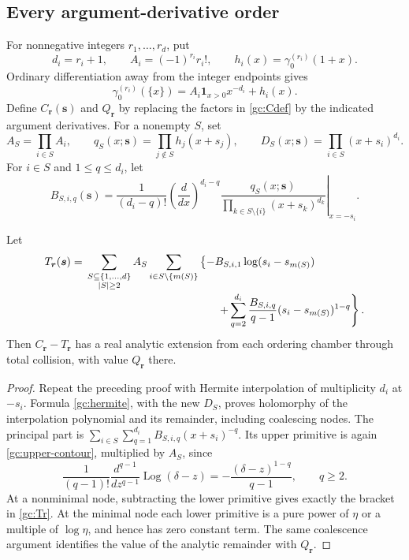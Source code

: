 \subsection{Every argument-derivative order}
For nonnegative integers $r_1,\ldots,r_d$, put
\[
 d_i=r_i+1,\qquad A_i=(-1)^{r_i}r_i!,\qquad
 h_i(x)=\gamma_0^{(r_i)}(1+x).
\]
Ordinary differentiation away from the integer endpoints gives
\[
 \gamma_0^{(r_i)}(\{x\})
    =A_i\boldsymbol{1}_{x>0}x^{-d_i}+h_i(x).
\]
Define $C_{\boldsymbol r}(\boldsymbol s)$ and $Q_{\boldsymbol r}$ by
replacing the factors in \eqref{gc:Cdef} by the indicated argument
derivatives.  For a nonempty $S$, set
\[
 A_S=\prod_{i\in S}A_i,\qquad
 q_S(x;\boldsymbol s)=\prod_{j\notin S}h_j(x+s_j),\qquad
 D_S(x;\boldsymbol s)=\prod_{i\in S}(x+s_i)^{d_i}.
\]
For $i\in S$ and $1\le q\le d_i$, let
\begin{equation}\label{gc:B}
 B_{S,i,q}(\boldsymbol s)=
 \frac1{(d_i-q)!}
 \left.\left(\frac{d}{dx}\right)^{d_i-q}
 \frac{q_S(x;\boldsymbol s)}
 {\prod_{k\in S\setminus\{i\}}(x+s_k)^{d_k}}
 \right|_{x=-s_i}.
\end{equation}

\begin{theorem}\label{gc:derivative}
Let
\begin{align}\label{gc:Tr}
 T_{\boldsymbol r}(\boldsymbol s)
 ={}&\sum_{\substack{S\subseteq\{1,\ldots,d\}\\ |S|\ge2}}
 A_S\sum_{i\in S\setminus\{m(S)\}}
 \left\{-B_{S,i,1}\log(s_i-s_{m(S)})\right.\notag\\[-2pt]
 &\hspace{42mm}\left.
 +\sum_{q=2}^{d_i}\frac{B_{S,i,q}}{q-1}
                   (s_i-s_{m(S)})^{1-q}\right\}.
\end{align}
Then $C_{\boldsymbol r}-T_{\boldsymbol r}$ has a real analytic extension
from each ordering chamber through total collision, with value
$Q_{\boldsymbol r}$ there.
\end{theorem}

\begin{proof}
Repeat the preceding proof with Hermite interpolation of multiplicity
$d_i$ at $-s_i$.  Formula \eqref{gc:hermite}, with the new $D_S$, proves
holomorphy of the interpolation polynomial and its remainder, including
coalescing nodes.  The principal part is
$\sum_{i\in S}\sum_{q=1}^{d_i}B_{S,i,q}(x+s_i)^{-q}$.  Its upper primitive
is again \eqref{gc:upper-contour}, multiplied by $A_S$, since
\[
 \frac1{(q-1)!}\frac{d^{q-1}}{dz^{q-1}}
      \operatorname{Log}(\delta-z)
 =-\frac{(\delta-z)^{1-q}}{q-1},\qquad q\ge2.
\]
At a nonminimal node, subtracting the lower primitive gives exactly the
bracket in \eqref{gc:Tr}.  At the minimal node each lower primitive is a
pure power of $\eta$ or a multiple of $\log\eta$, and hence has zero
constant term.  The same coalescence argument identifies the value of the
analytic remainder with $Q_{\boldsymbol r}$.
\end{proof}


